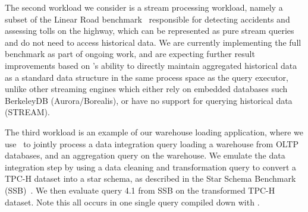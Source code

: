 The second workload we consider is a stream processing workload, namely a subset
of the Linear Road benchmark~\cite{arasu-vldb:04} responsible for detecting
accidents and assessing tolls on the highway, which can be represented as pure
stream queries and do not need to access historical data. We are currently
implementing the full benchmark as part of ongoing work, and are expecting
further result improvements based on \compiler's ability to directly maintain
aggregated historical data as a standard data structure in the same process space
as the query executor, unlike other streaming engines which either rely on
embedded databases such BerkeleyDB (Aurora/Borealis), or have no support for
querying historical data (STREAM).

The third workload is an example of our warehouse loading application, where we
use \compiler\ to jointly process a data integration query loading a warehouse
from OLTP databases, and an aggregation query on the warehouse. We emulate the
data integration step by using a data cleaning and transformation query to
convert a TPC-H dataset into a star schema, as described in the Star Schema
Benchmark (SSB)~\cite{poneil-ssb:07}. We then evaluate query 4.1 from SSB on the
transformed TPC-H dataset. Note this all occurs in one single query compiled down
with \compiler.


